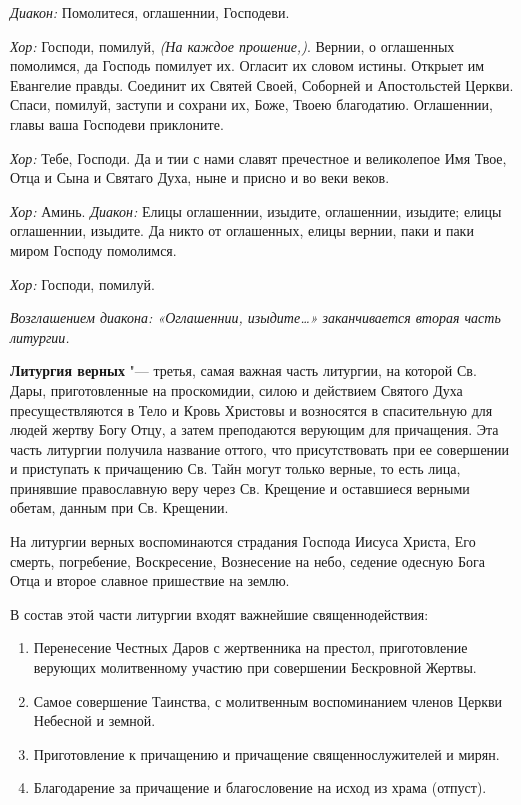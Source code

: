 \begin{mymulticols}


{\itshape Диакон:} Помолитеся, оглашеннии, Господеви.


{\itshape Хор:} Господи, помилуй, {\itshape (На каждое прошение,)}. Вернии, о оглашенных помолимся, да Господь помилует их. Огласит их словом истины. Открыет им Евангелие правды. Соединит их Святей Своей, Соборней и Апостольстей Церкви. Спаси, помилуй, заступи и сохрани их, Боже, Твоею благодатию. Оглашеннии, главы ваша Господеви приклоните.


{\itshape Хор:} Тебе, Господи. Да и тии с нами славят пречестное и великолепое Имя Твое, Отца и Сына и Святаго Духа, ныне и присно и во веки веков.


{\itshape Хор:} Аминь. {\itshape Диакон:} Елицы оглашеннии, изыдите, оглашеннии, изыдите; елицы оглашеннии, изыдите. Да никто от оглашенных, елицы вернии, паки и паки миром Господу помолимся.


{\itshape Хор:} Господи, помилуй.


{\itshape Возглашением диакона: «Оглашеннии, изыдите…» заканчивается вторая часть литургии.}


\end{mymulticols}

\mychapterending


 


{\bfseries Литургия верных} "--- третья, самая важная часть литургии, на которой Св. Дары, приготовленные на проскомидии, силою и действием Святого Духа пресуществляются в Тело и Кровь Христовы и возносятся в спасительную для людей жертву Богу Отцу, а затем преподаются верующим для причащения. Эта часть литургии получила название оттого, что присутствовать при ее совершении и приступать к причащению Св. Тайн могут только верные, то есть лица, принявшие православную веру через Св. Крещение и оставшиеся верными обетам, данным при Св. Крещении.



  На литургии верных воспоминаются страдания Господа Иисуса Христа, Его смерть, погребение, Воскресение, Вознесение на небо, седение одесную Бога Отца и второе славное пришествие на землю.


В состав этой части литургии входят важнейшие священнодействия:
\begin{enumerate}

\item Перенесение Честных Даров с жертвенника на престол, приготовление верующих молитвенному участию при совершении Бескровной Жертвы.


\item Самое совершение Таинства, с молитвенным воспоминанием членов Церкви Небесной и земной. 


\item Приготовление к причащению и причащение священнослужителей и мирян.


\item Благодарение за причащение и благословение на исход из храма (отпуст).

\end{enumerate}

